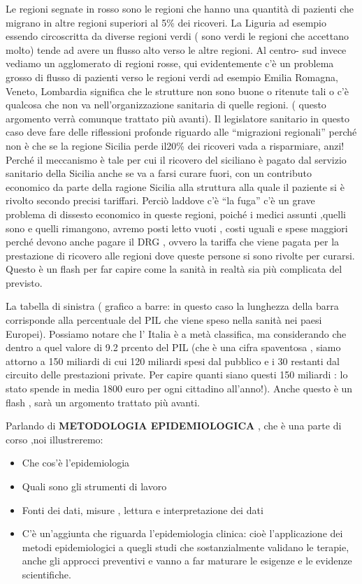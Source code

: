   Le regioni segnate in rosso sono le regioni che hanno una quantità di
  pazienti che migrano in altre regioni superiori al 5\% dei ricoveri.
  La Liguria ad esempio essendo circoscritta da diverse regioni verdi (
  sono verdi le regioni che accettano molto) tende ad avere un flusso
  alto verso le altre regioni. Al centro- sud invece vediamo un
  agglomerato di regioni rosse, qui evidentemente c'è un problema grosso
  di flusso di pazienti verso le regioni verdi ad esempio Emilia
  Romagna, Veneto, Lombardia significa che le strutture non sono buone o
  ritenute tali o c'è qualcosa che non va nell'organizzazione sanitaria
  di quelle regioni. ( questo argomento verrà comunque trattato più
  avanti). Il legislatore sanitario in questo caso deve fare delle
  riflessioni profonde riguardo alle ``migrazioni regionali'' perché non
  è che se la regione Sicilia perde il20\% dei ricoveri vada a
  risparmiare, anzi! Perché il meccanismo è tale per cui il ricovero del
  siciliano è pagato dal servizio sanitario della Sicilia anche se va a
  farsi curare fuori, con un contributo economico da parte della ragione
  Sicilia alla struttura alla quale il paziente si è rivolto secondo
  precisi tariffari. Perciò laddove c'è ``la fuga'' c'è un grave
  problema di dissesto economico in queste regioni, poiché i medici
  assunti ,quelli sono e quelli rimangono, avremo posti letto vuoti ,
  costi uguali e spese maggiori perché devono anche pagare il DRG ,
  ovvero la tariffa che viene pagata per la prestazione di ricovero alle
  regioni dove queste persone si sono rivolte per curarsi. Questo è un
  flash per far capire come la sanità in realtà sia più complicata del
  previsto.

  La tabella di sinistra ( grafico a barre: in questo caso la lunghezza
  della barra corrisponde alla percentuale del PIL che viene speso nella
  sanità nei paesi Europei). Possiamo notare che l' Italia è a metà
  classifica, ma considerando che dentro a quel valore di 9.2 prcento
  del PIL (che è una cifra spaventosa , siamo attorno a 150 miliardi di
  cui 120 miliardi spesi dal pubblico e i 30 restanti dal circuito delle
  prestazioni private. Per capire quanti siano questi 150 miliardi : lo
  stato spende in media 1800 euro per ogni cittadino all'anno!). Anche
  questo è un flash , sarà un argomento trattato più avanti.

  Parlando di \textbf{METODOLOGIA EPIDEMIOLOGICA} , che è una parte di
  corso ,noi illustreremo:

\begin{itemize}
\item
  Che cos'è l'epidemiologia
\item
  Quali sono gli strumenti di lavoro
\item
  Fonti dei dati, misure , lettura e interpretazione dei dati
\item
  C'è un'aggiunta che riguarda l'epidemiologia clinica: cioè
  l'applicazione dei metodi epidemiologici a quegli studi che
  sostanzialmente validano le terapie, anche gli approcci preventivi e
  vanno a far maturare le esigenze e le evidenze scientifiche.
\end{itemize}

